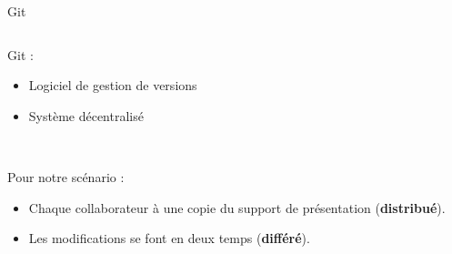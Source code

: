 \begin{frame}{Git}
\begin{columns}
  \begin{column}{.55\textwidth}
  Git :
  \begin{itemize}
    \item Logiciel de gestion de versions
    \item Système décentralisé
  \end{itemize}~

  Pour notre scénario :
  \begin{itemize}
    \item Chaque collaborateur à une copie du support de présentation
    (\textbf{distribué}).
    \item Les modifications se font en deux temps (\textbf{différé}).
  \end{itemize}
  \end{column}


\end{columns}
\end{frame}
